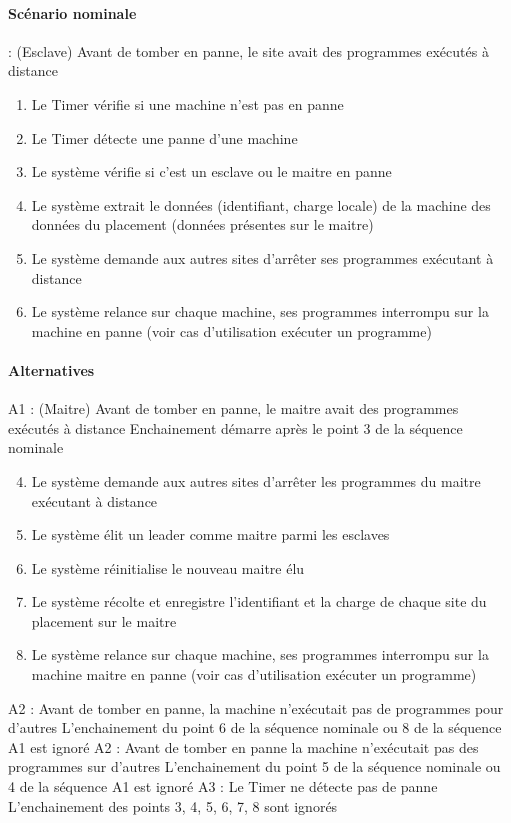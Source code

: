     \paragraph{Scénario nominale} : (Esclave) Avant de tomber en panne, le site avait des programmes exécutés à
    distance
        \begin{enumerate}
          \item Le Timer vérifie si une machine n'est pas en panne
          \item Le Timer détecte une panne d'une machine
          \item Le système vérifie si c'est un esclave ou le maitre en panne
          \item Le système extrait le données (identifiant, charge locale) de la machine des données du
              placement (données présentes sur le maitre)
          \item Le système demande aux autres sites d'arrêter ses programmes exécutant à distance
          \item Le système relance sur chaque machine, ses programmes interrompu sur la machine en
              panne (voir cas d'utilisation exécuter un programme)
        \end{enumerate}
    \paragraph{Alternatives}
    A1 : (Maitre) Avant de tomber en panne, le maitre avait des programmes exécutés à distance
         Enchainement démarre après le point 3 de la séquence nominale
        \begin{enumerate}
        \setcounter{enumi}{3}
          \item Le système demande aux autres sites d'arrêter les programmes du maitre exécutant à
              distance
          \item Le système élit un leader comme maitre parmi les esclaves
          \item Le système réinitialise le nouveau maitre élu
          \item Le système récolte et enregistre l'identifiant et la charge de chaque site du placement sur le
              maitre
          \item Le système relance sur chaque machine, ses programmes interrompu sur la machine maitre
              en panne (voir cas d'utilisation exécuter un programme)
        \end{enumerate}
    A2 : Avant de tomber en panne, la machine n'exécutait pas de programmes pour d'autres
         L'enchainement du point 6 de la séquence nominale ou 8 de la séquence A1 est ignoré
    A2 : Avant de tomber en panne la machine n'exécutait pas des programmes sur d'autres
         L'enchainement du point 5 de la séquence nominale ou 4 de la séquence A1 est ignoré
    A3 : Le Timer ne détecte pas de panne
       L'enchainement des points 3, 4, 5, 6, 7, 8 sont ignorés
